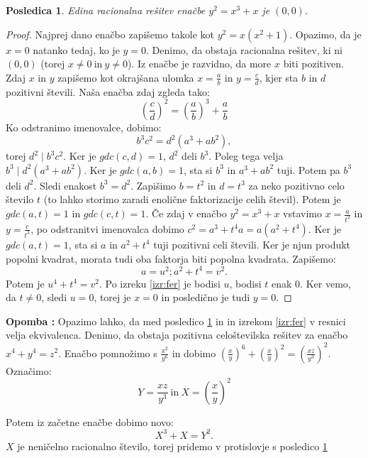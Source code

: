 \documentclass[a4paper, 10pt]{article}
\newtheorem{posl}{Posledica}[izr]
\newcounter{opombe}
\newenvironment{opomba}{\begin{flushleft}\stepcounter{opombe}\textbf{Opomba \arabic{opombe}:}}{\hfill\end{flushleft}}
\begin{document}
\newpage

\begin{posl}
\label{pos:stiri}
Edina racionalna rešitev enačbe $y^2 = x^3 + x$ je $(0, 0)$.
\end{posl}

\begin{proof}
Najprej dano enačbo zapišemo takole kot $y^2 = x(x^2 + 1)$. Opazimo, da je $x = 0$ natanko tedaj, ko je $y = 0$. Denimo, da obstaja racionalna rešitev, ki ni $(0, 0)$ (torej $x \neq 0~\text{in}~y \neq 0$). Iz enačbe je razvidno, da more $x$ biti pozitiven. Zdaj $x$ in $y$ zapišemo kot okrajšana ulomka $x = \frac{a}{b}$ in $y = \frac{c}{d}$, kjer sta $b$ in $d$ pozitivni števili.
Naša enačba zdaj zgleda tako:
\[
(\frac{c}{d})^2 = (\frac{a}{b})^3 + \frac{a}{b}
\]
Ko odstranimo imenovalce, dobimo:
\[
b^3c^2 = d^2(a^3 + ab^2),
\]
torej $d^2 \mid b^3c^2$. Ker je $gdc(c, d) = 1$, $d^2$ deli $b^3$. Poleg tega velja $b^3 \mid d^2(a^3 + ab^2)$.
Ker je $gdc(a, b) = 1$, sta si  $b^3$ in $a^3 + ab^2$ tuji. Potem pa $b^3$ deli $d^2$. Sledi enakost $b^3 = d^2$. Zapišimo $b = t^2$ in
$d = t^3$ za neko pozitivno celo število $t$ (to lahko storimo zaradi enolične faktorizacije celih števil). Potem je $gdc(a, t) = 1$ in $gdc(c, t) = 1$.
Če zdaj v enačbo $y^2 = x^3+x$ vstavimo $x =\frac{a}{t^2}$ in $y = \frac{c}{t^3}$, po odstranitvi imenovalca dobimo $c^2 = a^3+t^4a = a(a^2+t^4)$.
Ker je $gdc(a, t) = 1$, sta si $a$ in $a^2 + t^4$ tuji pozitivni celi števili. Ker je njun produkt popolni kvadrat, morata tudi oba faktorja biti popolna kvadrata. Zapišemo:
\[
a = u^2; a^2 + t^4 = v^2.
\]
Potem je $u^4 + t^4 = v^2$. Po izreku \ref{izr:fer} je bodisi $u$, bodisi $t$ enak $0$. Ker vemo, da $t \neq 0$, sledi $u = 0$, torej je $x = 0$ in posledično je tudi $y = 0$.
\end{proof}

\begin{opomba}
Opazimo lahko, da med posledico \ref{pos:stiri} in in izrekom \ref{izr:fer} v resnici velja ekvivalenca. Denimo, da obstaja pozitivna celoštevilska rešitev za enačbo $x^4 + y^4 = z^2$.
Enačbo pomnožimo s $\frac{x^2}{y^6}$ in dobimo $(\frac{x}{y})^6 + (\frac{x}{y})^2 = (\frac{xz}{y^3})^2$. Označimo:
\[
Y =\frac{xz}{y^3}~\text{in}~X= (\frac{x}{y})^2
\]

Potem iz začetne enačbe dobimo novo:
\[
X^3 + X = Y^2.
\]
$X$ je neničelno racionalno število, torej pridemo v protislovje s posledico \ref{pos:stiri}
\end{opomba}

\newpage
\end{document}
